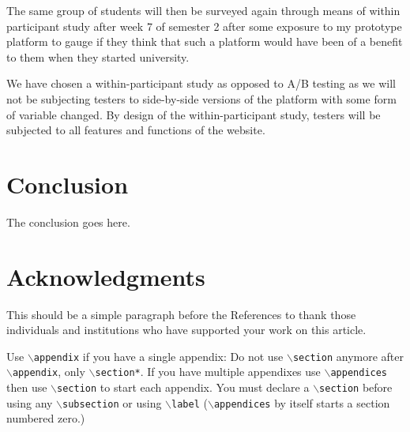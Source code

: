 \documentclass[lettersize,journal]{IEEEtran}
\begin{document}
    The same group of students will then be surveyed again through means of within
    participant study after week 7 of semester 2 after some exposure to my prototype
    platform to gauge if they think that such a platform would have been of a benefit
    to them when they started university.

    We have chosen a within-participant study as opposed to A/B
    testing as we will not be subjecting testers to side-by-side
    versions of the platform with some form of variable
    changed. By design of the within-participant study,
    testers will be subjected to all features and functions of the
    website.

\section{Conclusion}
    The conclusion goes here.


\section*{Acknowledgments}
    This should be a simple paragraph before the References to thank those individuals and
    institutions who have supported your work on this article.



{
    Use $\backslash${\tt{appendix}} if you have a single appendix:
    Do not use $\backslash${\tt{section}} anymore after $\backslash${\tt{appendix}}, only $\backslash${\tt{section*}}.
    If you have multiple appendixes use $\backslash${\tt{appendices}} then use $\backslash${\tt{section}} to start each appendix.
You must declare a $\backslash${\tt{section}} before using any $\backslash${\tt{subsection}} or using $\backslash${\tt{label}} ($\backslash${\tt{appendices}} by itself
 starts a section numbered zero.)}



\end{document}
